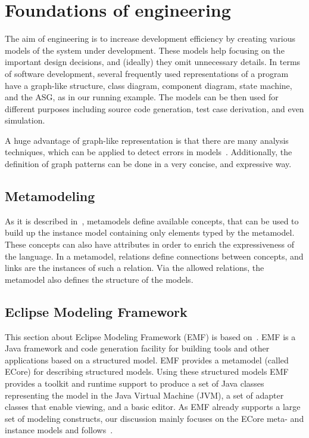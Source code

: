\section{Foundations of \modeldriven engineering}
\label{sec:mde}

The aim of \modeldriven engineering is to increase development efficiency by creating various models of the system under development. These models help focusing on the important design decisions, and (ideally) they omit unnecessary details. In terms of software development, several frequently used representations of a program have a graph-like structure, \eg class diagram, component diagram, state machine, and the ASG, as in our running example. The models can be then used for different purposes including source code generation, test case derivation, and even simulation.

A huge advantage of graph-like representation is that there are many analysis techniques, which can be applied to detect errors in models~\cite{DBLP:conf/kbse/CsertanHMPPV02, bur}. Additionally, the definition of graph patterns can be done in a very concise, and expressive way. 


\subsection{Metamodeling}

As it is described in~\cite{osemerath/msc}, metamodels define available concepts, that can be used to build up the instance model containing only elements typed by the metamodel. These concepts can also have attributes in order to enrich the expressiveness of the language. In a metamodel, relations define connections between concepts, and links are the instances of such a relation. Via the allowed relations, the metamodel also defines the structure of the models.


\subsection{Eclipse Modeling Framework}
\label{sec:EMF}


This section about Eclipse Modeling Framework (EMF) is based on~\cite{ahorvath/msc}. EMF is a Java framework and code generation facility for building tools and other applications based on a structured model. EMF provides a metamodel (called ECore) for describing structured models. Using these structured models EMF provides a toolkit and runtime support to produce a set of Java classes representing the model in the Java Virtual Machine (JVM), a set of adapter classes that enable viewing, and a basic editor. As EMF already supports a large set of modeling constructs, our discussion mainly focuses on the ECore meta- and instance models and follows~\cite{Budinsky2003}.

